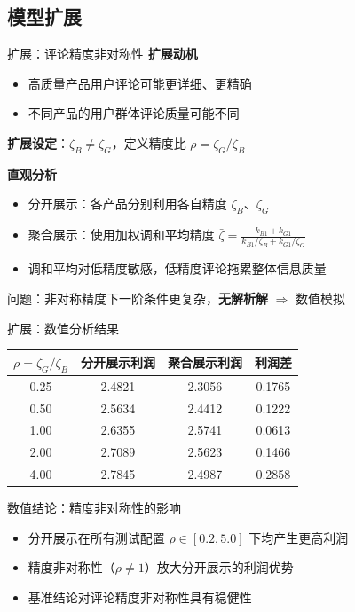 \documentclass[aspectratio=169,10pt]{beamer}
\newcommand{\pos}[1]{\textcolor{positive}{#1}}
\newcommand{\con}[1]{\textcolor{negative}{#1}}
\newcommand{\HL}[1]{\textcolor{emphasis}{#1}}
\begin{document}
\subsection{模型扩展}

\begin{frame}{扩展：评论精度非对称性}
\textbf{扩展动机}
\begin{itemize}
    \item 高质量产品用户评论可能更详细、更精确
    \item 不同产品的用户群体评论质量可能不同
\end{itemize}

\vspace{6pt}
\textbf{扩展设定}：$\zeta_B \neq \zeta_G$，定义精度比 $\rho = \zeta_G / \zeta_B$

\vspace{6pt}
\textbf{直观分析}
\begin{itemize}
    \item 分开展示：各产品分别利用各自精度 $\zeta_B$、$\zeta_G$
    \item 聚合展示：使用\con{加权调和平均}精度 $\bar{\zeta} = \frac{k_{B1} + k_{G1}}{k_{B1}/\zeta_B + k_{G1}/\zeta_G}$
    \item 调和平均对低精度敏感，低精度评论拖累整体信息质量
\end{itemize}

\vspace{6pt}
\con{问题}：非对称精度下一阶条件更复杂，\textbf{无解析解} $\Rightarrow$ 数值模拟
\end{frame}

\begin{frame}{扩展：数值分析结果}
\begin{center}
\small
\begin{tabular}{cccc}
\toprule
$\rho = \zeta_G/\zeta_B$ & 分开展示利润 & 聚合展示利润 & 利润差 \\
\midrule
0.25 & 2.4821 & 2.3056 & \pos{0.1765} \\
0.50 & 2.5634 & 2.4412 & 0.1222 \\
1.00 & 2.6355 & 2.5741 & 0.0613 \\
2.00 & 2.7089 & 2.5623 & 0.1466 \\
4.00 & 2.7845 & 2.4987 & \pos{0.2858} \\
\bottomrule
\end{tabular}
\end{center}

\vspace{8pt}
\begin{block}{数值结论：精度非对称性的影响}
\begin{itemize}
    \item 分开展示在所有测试配置 $\rho \in [0.2, 5.0]$ 下均产生更高利润
    \item 精度非对称性（$\rho \neq 1$）\HL{放大}分开展示的利润优势
    \item 基准结论对评论精度非对称性具有稳健性
\end{itemize}
\end{block}
\end{frame}
\end{document}

